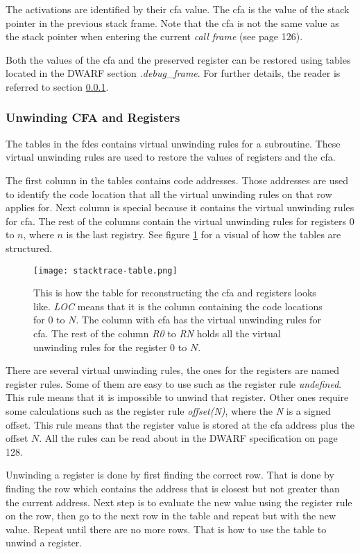 The activations are identified by their \gls{cfa} value. 
The \gls{cfa} is the value of the stack pointer in the previous stack frame.
Note that the \gls{cfa} is not the same value as the stack pointer when entering the current \emph{call frame} (see \cite{dwarf} page 126).


Both the values of the \gls{cfa} and the preserved register can be restored using tables located in the \gls{DWARF} section \emph{.debug\_frame}.
For further details, the reader is referred to section \ref{sec:evalcfa}.



\subsubsection{Unwinding CFA and Registers} \label{sec:evalcfa}
The tables in the \glspl{fde} contains virtual unwinding rules for a subroutine.
These virtual unwinding rules are used to restore the values of registers and the \gls{cfa}.


The first column in the tables contains code addresses.
Those addresses are used to identify the code location that all the virtual unwinding rules on that row applies for.
Next column is special because it contains the virtual unwinding rules for \gls{cfa}.
The rest of the columns contain the virtual unwinding rules for registers $0$ to $n$, where $n$ is the last registry.
See figure \ref{fig:stacktracetable} for a visual of how the tables are structured.


\begin{figure}[h]
	\centering
	\texttt{[image: stacktrace-table.png]}
	\caption{This is how the table for reconstructing the \gls{cfa} and registers looks like. \emph{LOC} means that it is the column containing the code locations for $0$ to $N$. The column with \gls{cfa} has the virtual unwinding rules for \gls{cfa}. The rest of the column \emph{R0} to \emph{RN} holds all the virtual unwinding rules for the register $0$ to $N$.}
	\label{fig:stacktracetable}
\end{figure}


There are several virtual unwinding rules, the ones for the registers are named register rules.
Some of them are easy to use such as the register rule \emph{undefined}.
This rule means that it is impossible to unwind that register.
Other ones require some calculations such as the register rule \emph{offset(N)}, where the \emph{N} is a signed offset.
This rule means that the register value is stored at the \gls{cfa} address plus the offset $N$.
All the rules can be read about in the \gls{DWARF} specification \cite{dwarf} on page 128.


Unwinding a register is done by first finding the correct row.
That is done by finding the row which contains the address that is closest but not greater than the current address.
Next step is to evaluate the new value using the register rule on the row, then go to the next row in the table and repeat but with the new value.
Repeat until there are no more rows.
That is how to use the table to unwind a register.
